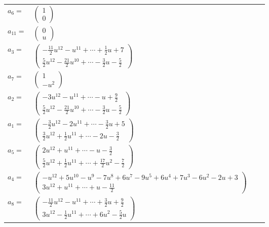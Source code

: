 \documentclass[1p]{elsarticle_modified}
\theoremstyle{definition}
\begin{document}
\begin{tabular}{m{7pt} m{180pt} m{7pt} m{180pt} }
\flushright $a_{6}=$&$\begin{pmatrix}1\\0\end{pmatrix}$ \\
\flushright $a_{11}=$&$\begin{pmatrix}0\\u\end{pmatrix}$ \\
\flushright $a_{3}=$&$\begin{pmatrix}-\frac{11}{2} u^{12}- u^{11}+\cdots+\frac{1}{2} u+7\\\frac{5}{2} u^{12}-\frac{21}{2} u^{10}+\cdots-\frac{3}{2} u-\frac{5}{2}\end{pmatrix}$ \\
\flushright $a_{7}=$&$\begin{pmatrix}1\\- u^2\end{pmatrix}$ \\
\flushright $a_{2}=$&$\begin{pmatrix}-3 u^{12}- u^{11}+\cdots- u+\frac{9}{2}\\\frac{5}{2} u^{12}-\frac{21}{2} u^{10}+\cdots-\frac{3}{2} u-\frac{5}{2}\end{pmatrix}$ \\
\flushright $a_{1}=$&$\begin{pmatrix}-\frac{3}{2} u^{12}-2 u^{11}+\cdots-\frac{3}{2} u+5\\\frac{3}{2} u^{12}+\frac{1}{2} u^{11}+\cdots-2 u-\frac{3}{2}\end{pmatrix}$ \\
\flushright $a_{5}=$&$\begin{pmatrix}2 u^{12}+u^{11}+\cdots- u-\frac{3}{2}\\\frac{5}{2} u^{12}+\frac{1}{2} u^{11}+\cdots+\frac{17}{2} u^2-\frac{7}{2}\end{pmatrix}$ \\
\flushright $a_{4}=$&$\begin{pmatrix}- u^{12}+5 u^{10}- u^9-7 u^8+6 u^7-9 u^5+6 u^4+7 u^3-6 u^2-2 u+3\\3 u^{12}+u^{11}+\cdots+u-\frac{11}{2}\end{pmatrix}$ \\
\flushright $a_{8}=$&$\begin{pmatrix}-\frac{11}{2} u^{12}- u^{11}+\cdots+\frac{3}{2} u+\frac{9}{2}\\3 u^{12}-\frac{1}{2} u^{11}+\cdots+6 u^2-\frac{5}{2} u\end{pmatrix}$ \\

\end{tabular}
\end{document}
